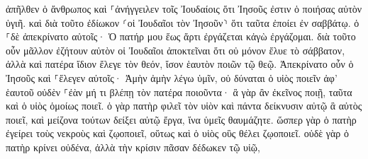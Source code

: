 \documentclass{openreader}
\begin{document}
ἀπῆλθεν ὁ ἄνθρωπος καὶ ⸀ἀνήγγειλεν τοῖς Ἰουδαίοις ὅτι Ἰησοῦς ἐστιν ὁ ποιήσας αὐτὸν ὑγιῆ. 
καὶ διὰ τοῦτο ἐδίωκον ⸂οἱ Ἰουδαῖοι τὸν Ἰησοῦν⸃ ὅτι ταῦτα ἐποίει ἐν σαββάτῳ. 
ὁ ⸀δὲ ἀπεκρίνατο αὐτοῖς· Ὁ πατήρ μου ἕως ἄρτι ἐργάζεται κἀγὼ ἐργάζομαι. 
διὰ τοῦτο οὖν μᾶλλον ἐζήτουν αὐτὸν οἱ Ἰουδαῖοι ἀποκτεῖναι ὅτι οὐ μόνον ἔλυε τὸ σάββατον, ἀλλὰ καὶ πατέρα ἴδιον ἔλεγε τὸν θεόν, ἴσον ἑαυτὸν ποιῶν τῷ θεῷ. 
Ἀπεκρίνατο οὖν ὁ Ἰησοῦς καὶ ⸀ἔλεγεν αὐτοῖς· Ἀμὴν ἀμὴν λέγω ὑμῖν, οὐ δύναται ὁ υἱὸς ποιεῖν ἀφ’ ἑαυτοῦ οὐδὲν ⸀ἐὰν μή τι βλέπῃ τὸν πατέρα ποιοῦντα· ἃ γὰρ ἂν ἐκεῖνος ποιῇ, ταῦτα καὶ ὁ υἱὸς ὁμοίως ποιεῖ. 
ὁ γὰρ πατὴρ φιλεῖ τὸν υἱὸν καὶ πάντα δείκνυσιν αὐτῷ ἃ αὐτὸς ποιεῖ, καὶ μείζονα τούτων δείξει αὐτῷ ἔργα, ἵνα ὑμεῖς θαυμάζητε. 
ὥσπερ γὰρ ὁ πατὴρ ἐγείρει τοὺς νεκροὺς καὶ ζῳοποιεῖ, οὕτως καὶ ὁ υἱὸς οὓς θέλει ζῳοποιεῖ. 
οὐδὲ γὰρ ὁ πατὴρ κρίνει οὐδένα, ἀλλὰ τὴν κρίσιν πᾶσαν δέδωκεν τῷ υἱῷ, 
\end{document}
